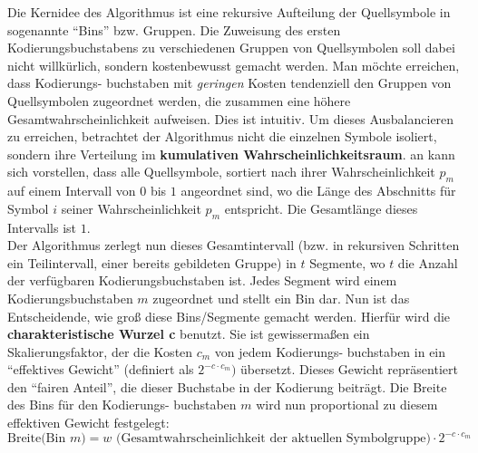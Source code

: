 \documentclass[a4paper,10pt,ngerman]{scrartcl}
\begin{document}
\newline
Die Kernidee des Algorithmus ist eine rekursive Aufteilung der Quellsymbole in sogenannte “Bins” bzw. Gruppen. Die Zuweisung des ersten Kodierungsbuchstabens zu verschiedenen Gruppen von Quellsymbolen soll dabei nicht willkürlich, sondern kostenbewusst gemacht werden. Man möchte erreichen, dass Kodierungs- buchstaben mit \textit{geringen} Kosten tendenziell den Gruppen von Quellsymbolen zugeordnet werden, die zusammen eine höhere Gesamtwahrscheinlichkeit aufweisen. Dies ist intuitiv. 
\newline
Um dieses Ausbalancieren zu erreichen, betrachtet der Algorithmus nicht die einzelnen Symbole isoliert, sondern ihre Verteilung im \textbf{kumulativen Wahrscheinlichkeitsraum}. an kann sich vorstellen, dass alle Quellsymbole, sortiert nach ihrer Wahrscheinlichkeit $p_{m}$ auf einem Intervall von $0$ bis $1$ angeordnet sind, wo die Länge des Abschnitts für Symbol $i$ seiner Wahrscheinlichkeit $p_{m}$ entspricht. Die Gesamtlänge dieses Intervalls ist $1$. \\
\newline
Der Algorithmus zerlegt nun dieses Gesamtintervall (bzw. in rekursiven Schritten ein Teilintervall, einer bereits gebildeten Gruppe) in $t$ Segmente, wo $t$ die Anzahl der verfügbaren Kodierungsbuchstaben ist. Jedes Segment wird einem Kodierungsbuchstaben $m$ zugeordnet und stellt ein Bin dar.
\newline
Nun ist das Entscheidende, wie groß diese Bins/Segmente gemacht werden. Hierfür wird die \textbf{charakteristische Wurzel c} benutzt. Sie ist gewissermaßen ein Skalierungsfaktor, der die Kosten $c_{m}$ von jedem Kodierungs- buchstaben in ein “effektives Gewicht” (definiert als $2^{-c\cdot c_{m}})$ übersetzt. Dieses Gewicht repräsentiert den “fairen Anteil”, die dieser Buchstabe in der Kodierung beiträgt. Die Breite des Bins für den Kodierungs- buchstaben $m$ wird nun proportional zu diesem effektiven Gewicht festgelegt: \\
\newline
\begin{equation}
  \text{Breite(Bin } m \text{)} = w \text{ (Gesamtwahrscheinlichkeit der aktuellen Symbolgruppe)} \cdot 2^{-c \cdot c_{m}}
\end{equation}
\end{document}
